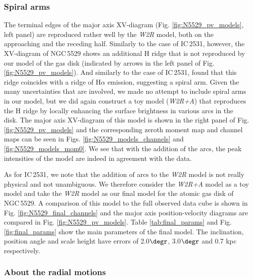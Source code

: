 \documentclass{aa}
\begin{document}
\subsubsection{Spiral arms}
\label{sec:N5529_spiralarms}

The terminal edges of the major axis XV-diagram (Fig. \ref{fig:N5529_pv_models}, left panel) are reproduced rather well by the \textit{W2R} model, both on the approaching and the receding half. Similarly to the case of IC\,2531, however, the XV-diagram of NGC\,5529 shows an additional H{} ridge that is not reproduced by our model of the gas disk (indicated by arrows in the left panel of Fig. \ref{fig:N5529_pv_models}). And similarly to the case of IC\,2531, \cite{kregel04b} found that this ridge coincides with a ridge of H$\alpha$ emission, suggesting a spiral arm. Given the many uncertainties that are involved, we made no attempt to include spiral arms in our model, but we did again construct a toy model (\emph{W2R+A}) that reproduces the H{} ridge by locally enhancing the surface brightness in various arcs in the disk. The major axis XV-diagram of this model is shown in the right panel of Fig. \ref{fig:N5529_pv_models} and the corresponding zeroth moment map and channel maps can be seen in Figs. \ref{fig:N5529_models_channels} and \ref{fig:N5529_models_mom0}. We see that with the addition of the arcs, the peak intensities of the model are indeed in agreement with the data.
\par
As for IC\,2531, we note that the addition of arcs to the \textit{W2R} model is not really physical and not unambiguous. We therefore consider the \textit{W2R+A} model as a toy model and take the \textit{W2R} model as our final model for the atomic gas disk of NGC\,5529. A comparison of this model to the full observed data cube is shown in Fig. \ref{fig:N5529_final_channels} and the major axis position-velocity diagrams are compared in Fig. \ref{fig:N5529_pv_models}. Table \ref{tab:final_params} and Fig. \ref{fig:final_params} show the main parameters of the final model. The inclination, position angle and scale height have errors of 2.0$\degr$, 3.0$\degr$ and 0.7 kpc respectively.


\subsubsection{About the radial motions}
\end{document}
